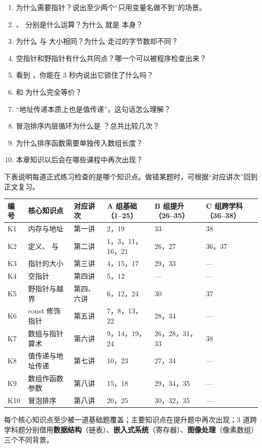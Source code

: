 \begin{checkbox}
\begin{enumerate}[label=\arabic*.,itemsep=1pt]
  \item 为什么需要指针？说出至少两个“只用变量名做不到”的场景。
  \item \cc{\&}、\cc{*} 分别是什么运算？为什么  就是  本身？
  \item 为什么  与  大小相同？为什么  走过的字节数却不同？
  \item 空指针和野指针有什么共同点？哪一个可以被程序检查出来？
  \item 看到 ，你能在 3 秒内说出它锁住了什么吗？
  \item {} 和  为什么完全等价？
  \item “地址传递本质上也是值传递”，这句话怎么理解？
  \item 冒泡排序内层循环为什么是 ？总共比较几次？
  \item 为什么排序函数需要单独传入数组长度？
  \item 本章知识以后会在哪些课程中再次出现？
\end{enumerate}
\end{checkbox}

下表说明每道正式练习检查的是哪个知识点。做错某题时，可根据“对应讲次”回到正文复习。

\begin{center}
\small
\noindent\begin{tabularx}{\linewidth}{@{}p{0.7cm}p{3.1cm}p{1.3cm}YYY@{}}
\toprule
{}编号 & 核心知识点 & 对应讲次 & A 组基础（1--25） & B 组提升（26--35） & C 组跨学科（36--38） \\
\midrule
K1 & 内存与地址 & 第一讲 & 2，19 & 33 & 38 \\
K2 & 定义、\cc{\&} 与 \cc{*} & 第二讲 & 1，3，11，16，21 & 26，27 & 36，37 \\
K3 & 指针的大小 & 第三讲 & 4，15，17 & 29，33 & — \\
K4 & 空指针 & 第四讲 & 5，12 & — & — \\
K5 & 野指针与越界 & 第四、六讲 & 6，12，24 & 30 & 37 \\
K6 & const 修饰指针 & 第五讲 & 7，8，13，22 & 28，34 & — \\
K7 & 数组与指针算术 & 第六讲 & 9，14，19，24 & 26，28，31，33 & 38 \\
K8 & 值传递与地址传递 & 第七讲 & 10，23 & 27，34 & — \\
K9 & 数组作函数参数 & 第八讲 & 15，18 & 29，34，35 & — \\
K10 & 冒泡排序 & 第八讲 & 20，25 & 30，32，35 & — \\
\bottomrule
\end{tabularx}
\end{center}
每个核心知识点至少被一道基础题覆盖；主要知识点在提升题中再次出现；3 道跨学科题分别借用\textbf{数据结构}（链表）、\textbf{嵌入式系统}（寄存器）、\textbf{图像处理}（像素数组）三个不同背景。

